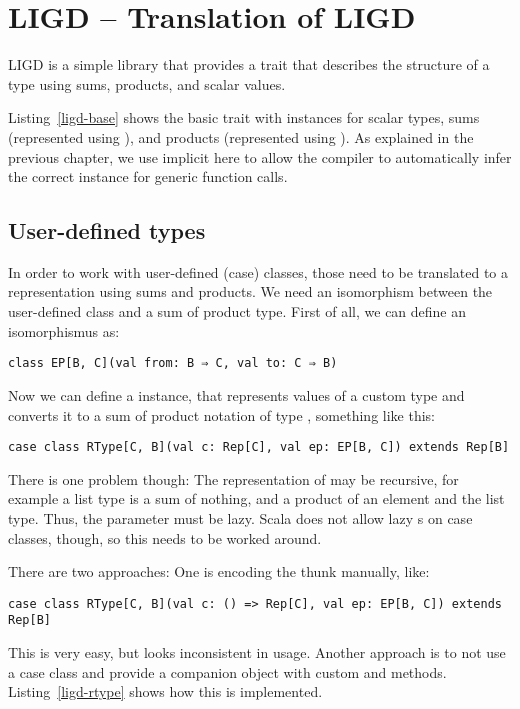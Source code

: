 \section{LIGD -- Translation of LIGD}


LIGD is a simple library that provides a  trait that describes
the structure of a type using sums, products, and scalar values.

Listing~\ref{ligd-base} shows the basic  trait with instances for
scalar types, sums (represented using ), and products (represented
using ). As explained in the previous chapter, we use implicit
here to allow the compiler to automatically infer the correct 
instance for generic function calls.


\subsection{User-defined types}
In order to work with user-defined (case) classes, those need to be
translated to a representation using sums and products. We need an
isomorphism between the user-defined class and a sum of product type. First
of all, we can define an isomorphismus as:
\begin{lstlisting}[gobble=2]
  class EP[B, C](val from: B ⇒ C, val to: C ⇒ B)
\end{lstlisting}
Now we can define a  instance, that represents values of a custom
type  and converts it to a sum of product notation of type ,
something like this:
\begin{lstlisting}[gobble=2]
  case class RType[C, B](val c: Rep[C], val ep: EP[B, C]) extends Rep[B]
\end{lstlisting}
There is one problem though: The representation of  may be recursive,
for example a list type is a sum of nothing, and a product of an element and
the list type. Thus, the parameter  must be lazy. Scala does not allow
lazy s on case classes, though, so this needs to be worked around.

There are two approaches: One is encoding the thunk manually, like:
\begin{lstlisting}[gobble=2]
  case class RType[C, B](val c: () => Rep[C], val ep: EP[B, C]) extends Rep[B]
\end{lstlisting}
This is very easy, but looks inconsistent in usage. Another approach is to
not use a case class and provide a companion object with custom 
and  methods. Listing~\ref{ligd-rtype} shows how this is
implemented.



